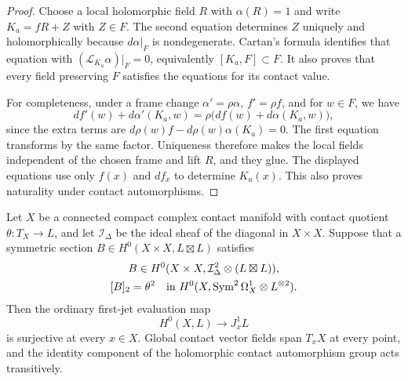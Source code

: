 \begin{proof}
Choose a local holomorphic field $R$ with $\alpha(R)=1$ and
write $K_a=fR+Z$ with $Z\in F$. The second equation determines
$Z$ uniquely and holomorphically because $d\alpha|_F$ is
nondegenerate. Cartan's formula identifies that equation with
$(\mathcal L_{K_a}\alpha)|_F=0$, equivalently
$[K_a,F]\subset F$. It also proves that every field preserving
$F$ satisfies the equations for its contact value.

For completeness, under a frame change
$\alpha'=\rho\alpha$, $f'=\rho f$, and for $w\in F$, we have
\[
df'(w)+d\alpha'(K_a,w)
=\rho\bigl(df(w)+d\alpha(K_a,w)\bigr),
\]
since the extra terms are
$d\rho(w)f-d\rho(w)\alpha(K_a)=0$. The first equation transforms
by the same factor. Uniqueness therefore makes the local fields
independent of the chosen frame and lift $R$, and they glue.
The displayed equations use only $f(x)$ and $df_x$ to determine
$K_a(x)$. This also proves naturality under contact automorphisms.
\end{proof}

\begin{theorem}\label{jet:criterion}
Let $X$ be a connected compact complex contact manifold with
contact quotient $\theta:T_X\to L$, and let $\mathcal I_\Delta$
be the ideal sheaf of the diagonal in $X\times X$.
Suppose that a symmetric section $B\in H^0(X\times X,L\boxtimes L)$
satisfies
\[
\begin{gathered}
B\in H^0(X\times X,\mathcal I_\Delta^2\otimes(L\boxtimes L)),\\
[B]_2=\theta^2
\quad\text{in }H^0(X,\operatorname{Sym}^2\Omega_X^1\otimes L^{\otimes2}).
\end{gathered}
\]
Then the ordinary first-jet evaluation map
\begin{equation}\label{jet:jet-generation}
H^0(X,L)\longrightarrow J_x^1L
\end{equation}
is surjective at every $x\in X$. Global contact vector fields
span $T_xX$ at every point, and the identity component of the
holomorphic contact automorphism group acts transitively.
\end{theorem}


